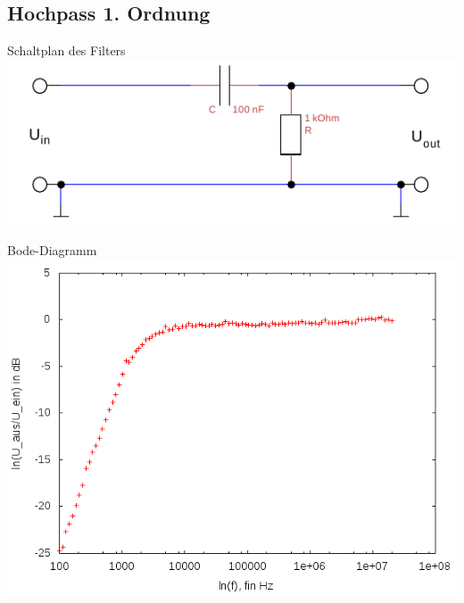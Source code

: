 \documentclass[compress,11pt]{beamer}
\begin{document}
\subsection{Hochpass 1. Ordnung}

\begin{frame}\begin{block}{Schaltplan des Filters}
\includegraphics[width=\textwidth]{../daten/Messdaten/plots/schalt_hoch}
\end{block}\end{frame}
\begin{frame}\begin{block}{Bode-Diagramm}
\centering
\includegraphics[width=.7\textwidth]{../daten/Messdaten/plots/Aufgabe2Bodediagramm_hochpass_gain}
\end{block}


\end{frame}
\end{document}
